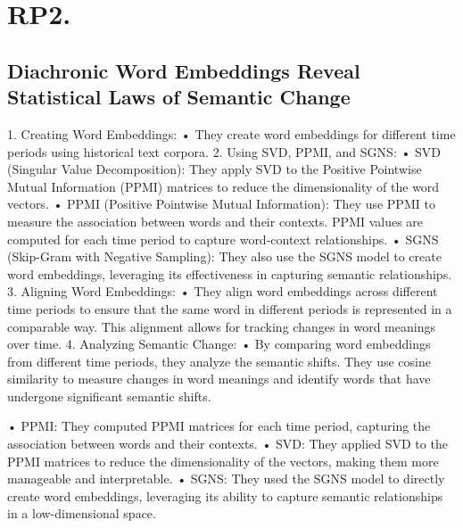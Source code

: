 
\section{RP2.} \label{sec:paper_hamilton}
\subsection{Diachronic Word Embeddings Reveal Statistical Laws of Semantic Change}

1.	Creating Word Embeddings:
•	They create word embeddings for different time periods using historical text corpora.
2.	Using SVD, PPMI, and SGNS:
•	SVD (Singular Value Decomposition): They apply SVD to the Positive Pointwise Mutual Information (PPMI) matrices to reduce the dimensionality of the word vectors.
•	PPMI (Positive Pointwise Mutual Information): They use PPMI to measure the association between words and their contexts. PPMI values are computed for each time period to capture word-context relationships.
•	SGNS (Skip-Gram with Negative Sampling): They also use the SGNS model to create word embeddings, leveraging its effectiveness in capturing semantic relationships.
3.	Aligning Word Embeddings:
•	They align word embeddings across different time periods to ensure that the same word in different periods is represented in a comparable way. This alignment allows for tracking changes in word meanings over time.
4.	Analyzing Semantic Change:
•	By comparing word embeddings from different time periods, they analyze the semantic shifts. They use cosine similarity to measure changes in word meanings and identify words that have undergone significant semantic shifts.

•	PPMI: They computed PPMI matrices for each time period, capturing the association between words and their contexts.
•	SVD: They applied SVD to the PPMI matrices to reduce the dimensionality of the vectors, making them more manageable and interpretable.
•	SGNS: They used the SGNS model to directly create word embeddings, leveraging its ability to capture semantic relationships in a low-dimensional space.
